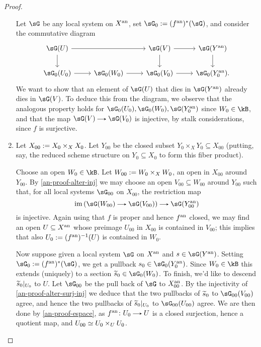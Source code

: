 \begin{nothing}
\begin{sublemma}
\begin{proof}
\begin{enumerate}[leftmargin=*]
        Let $\sG$ be any local system on $X^{\mathrm{an}}$, set $\sG_0 \ce (f^\an)^*(\sG)$, and consider the commutative diagram
        \[
          \begin{tikzcd}
            \sG(U) \ar[rr] \ar[d] &
            &
            \sG(V) \ar[r] \ar[d] &
            \sG(Y^\an) \ar[d] \\
            \sG_0(U_0) \ar[r] &
            \sG_0(W_0) \ar[r] &
            \sG_0(V_0) \ar[r] &
            \sG_0(Y_0^\an).
          \end{tikzcd}
        \]
        We want to show that an element of $\sG(U)$ that dies in $\sG(Y^\an)$ already dies in $\sG(V)$. To deduce this from the diagram, we observe that the analogous property holds for $\sG_0(U_0), \sG_0(W_0), \sG(Y_0^\an)$ since $W_0 \in \kB$, and that the map $\sG(V) \to \sG(V_0)$ is injective, by stalk considerations, since $f$ is surjective.

      \item Let $X_{00} \mathrel{:=} X_0 \times_X X_0$. Let $Y_{00}$ be the closed subset $Y_0 \times_X Y_0 \subseteq X_{00}$ (putting, say, the reduced scheme structure on $Y_0 \subseteq X_0$ to form this fiber product).

        Choose an open $W_0 \in \kB$. Let $W_{00} \mathrel{:=} W_0 \times_X W_0$, an open in $X_{00}$ around $Y_{00}$. By \cref{an-proof-alter-inj} we may choose an open $V_{00} \subseteq W_{00}$ around $Y_{00}$ such that, for all local systems $\sG_{00}$ on $X_{00}$, the restriction map
        \begin{equation}
          \label{an-proof-alter-surj-inj}
          \im\l(\sG(W_{00}) \to \sG(V_{00})\r) \to \sG(Y_{00}^\an)
        \end{equation}
        is injective. Again using that $f$ is proper and hence $f^{\mathrm{an}}$ closed, we may find an open $U \subseteq X^{\mathrm{an}}$ whose preimage $U_{00}$ in $X_{00}$ is contained in $V_{00}$; this implies that also $U_0 \mathrel{:=} (f^{\mathrm{an}})^{-1}(U)$ is contained in $W_0$.

        Now suppose given a local system $\sG$ on $X^{\mathrm{an}}$ and $s \in \sG(Y^\an)$. Setting $\sG_0 \ce (f^\an)^*(\sG)$, we get a pullback $s_0 \in \sG_0(Y_0^\an)$. Since $W_0 \in \kB$ this extends (uniquely) to a section $\til{s}_0 \in \sG_0(W_0)$. To finish, we'd like to descend $\widetilde{s}_0|_{U_0}$ to $U$. Let $\sG_{00}$ be the pull back of $\sG$ to $X_{00}^{\mathrm{an}}$. By the injectivity of \cref{an-proof-alter-surj-inj} we deduce that the two pullbacks of $\widetilde{s}_0$ to $\sG_{00}(V_{00})$ agree, and hence the two pullbacks of $\widetilde{s}_0|_{U_0}$ to $\sG_{00}(U_{00})$ agree. We are then done by \cref{an-proof-espace}, as $f^\an \c U_0 \to U$ is a closed surjection, hence a quotient map, and $U_{00} \simeq U_0 \times_U U_0$. \qedhere
      \end{enumerate}
    \end{proof}
  \end{sublemma}
  

\end{nothing}
